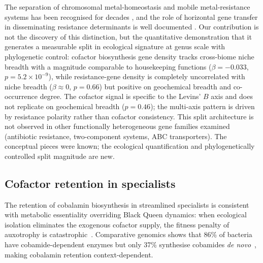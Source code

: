 \documentclass[times]{zHenriquesLab-StyleBioRxiv}
\begin{document}
The separation of chromosomal metal-homeostasis and mobile metal-resistance
systems has been recognised for decades \cite{silver1998,nies2000}, and the role
of horizontal gene transfer in disseminating resistance determinants is well
documented \cite{coombs2004,staehlin2016,rozycki2009,hemme2016,liebert1999,bouzat2013}. Our contribution
is not the discovery of this distinction, but the quantitative demonstration that
it generates a measurable split in ecological signature at genus scale with
phylogenetic control: cofactor biosynthesis gene density tracks cross-biome
niche breadth with a magnitude comparable to housekeeping functions
($\beta = -0.033$, $p = 5.2 \times 10^{-9}$), while resistance-gene density
is completely uncorrelated with niche breadth ($\beta \approx 0$, $p = 0.66$)
but positive on geochemical breadth and co-occurrence degree. The cofactor
signal is specific to the Levins' $B$ axis and does not replicate on
geochemical breadth ($p = 0.46$); the multi-axis pattern is driven by
resistance polarity rather than cofactor consistency. This split architecture
is not observed in other functionally heterogeneous gene families examined
(antibiotic resistance, two-component systems, ABC transporters). The
conceptual pieces were known; the ecological quantification and
phylogenetically controlled split magnitude are new.


\subsection{Cofactor retention in specialists}

The retention of cobalamin biosynthesis in streamlined specialists is
consistent with metabolic essentiality overriding Black Queen dynamics: when
ecological isolation eliminates the exogenous cofactor supply, the fitness
penalty of auxotrophy is catastrophic~\cite{sanudo2014}. Comparative genomics
shows that 86\% of bacteria have cobamide-dependent enzymes but only 37\%
synthesise cobamides \textit{de novo}~\cite{shelton2019}, making cobalamin
retention context-dependent.
\end{document}
